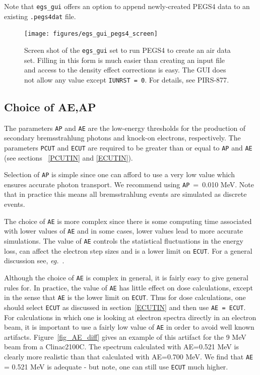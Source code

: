 \documentclass[12pt,twoside]{article}
\newcommand{\eg}{{\em eg.}}
\begin{document}
Note that {\tt egs\_gui} offers an option to append newly-created
PEGS4 data to an existing {\tt .pegs4dat} file.

\begin{figure}[htb]
   \leavevmode
   \begin{center}
   \texttt{[image: figures/egs\_gui\_pegs4\_screen]}
    \end{center}
   \caption{Screen shot of the {\tt egs\_gui} set to run PEGS4 to create
an air data set. Filling in this form is much easier than creating an input
file and access to the density effect corrections is easy. The GUI
does not allow any value except {\tt IUNRST = 0}. For details, see
PIRS-877\cite{Ka03}. }
   \label{fig_pegs4_screen}
\end{figure}

\subsection{Choice of AE,AP}
 
\label{AE}
  

The parameters  \verb+AP+ and  \verb+AE+ are the low-energy thresholds
for the production of secondary bremsstrahlung photons and knock-on
electrons, respectively.  The parameters \verb+PCUT+ and \verb+ECUT+ are
required to be greater than or equal to \verb+AP+ and  \verb+AE+ (see
sections ~\ref{PCUTIN} and \ref{ECUTIN}).

Selection of \verb+AP+ is simple since one can afford to use a very low
value which ensures accurate photon transport.  We recommend using
\verb+AP+~=~0.010 MeV.  Note that in practice this means all
bremsstrahlung events are simulated as discrete events.

The choice of \verb+AE+
is more complex since there is some computing time associated
with lower values of \verb+AE+ and in some cases, lower values lead to
more accurate simulations.
The value of \verb+AE+ controls the statistical fluctuations in the
energy loss, can affect the electron step sizes and is a lower limit on
\verb+ECUT+. For a general discussion see, \eg\ \cite{Ro84,RB90}.

Although the choice of \verb+AE+ is complex in general,
it is fairly easy to give general rules for.
In practice, the value of \verb+AE+ has little effect on dose
calculations, except in the sense that  \verb+AE+ is the lower limit on
\verb+ECUT+.  Thus for dose calculations, one should select \verb+ECUT+
as discussed in section~\ref{ECUTIN} and then use  \verb+AE = ECUT+.
For calculations in which one is looking at electron spectra directly in
an electron beam, it is important to use a fairly low value of
\verb+AE+ in order to avoid well known artifacts\cite{Ro84,RB90}.
Figure~\ref{fig_AE_diff} gives an example of this artifact for the 9 MeV
beam from a Clinac2100C.  The spectrum calculated with AE=0.521 MeV is
clearly more realistic than that calculated with AE=0.700 MeV.
We find that \verb+AE+ = 0.521 MeV is adequate - but note, one can still
use \verb+ECUT+ much higher.
\end{document}
